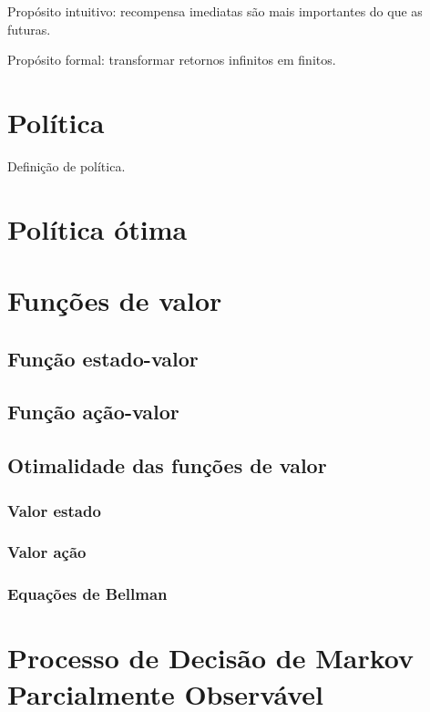 \documentclass{article}
\begin{document}
            Propósito intuitivo: recompensa imediatas são mais importantes do que as futuras.
            
            Propósito formal: transformar retornos infinitos em finitos.
        
    \section{Política}
    
        Definição de política.
    
        \section{Política ótima}
        
    
    \section{Funções de valor}
        
        \subsection{Função estado-valor}
        
        \subsection{Função ação-valor}
        
        \subsection{Otimalidade das funções de valor}
        
            \subsubsection{Valor estado}
            
            \subsubsection{Valor ação}
            
            \subsubsection{Equações de Bellman}
        
    \section{Processo de Decisão de Markov Parcialmente Observável}
\end{document}
